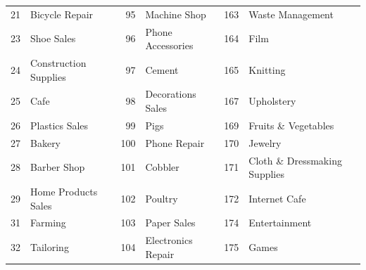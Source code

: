 \begin{longtable}[]{|r|l|r|l|r|l|}
	21                                & Bicycle Repair                     & 95                                & Machine Shop                       & 163                               & Waste Management                   \\
	23                                & Shoe Sales                         & 96                                & Phone Accessories                  & 164                               & Film                               \\
	24                                & Construction Supplies              & 97                                & Cement                             & 165                               & Knitting                           \\
	25                                & Cafe                               & 98                                & Decorations Sales                  & 167                               & Upholstery                         \\
	26                                & Plastics Sales                     & 99                                & Pigs                               & 169                               & Fruits \& Vegetables               \\
	27                                & Bakery                             & 100                               & Phone Repair                       & 170                               & Jewelry                            \\
	28                                & Barber Shop                        & 101                               & Cobbler                            & 171                               & Cloth \& Dressmaking
	Supplies                                                                                                                                                                                                                 \\
	29                                & Home Products Sales                & 102                               & Poultry                            & 172                               & Internet Cafe                      \\
	31                                & Farming                            & 103                               & Paper Sales                        & 174                               & Entertainment                      \\
	32                                & Tailoring                          & 104                               & Electronics Repair                 & 175                               & Games                              \\

\end{longtable}
